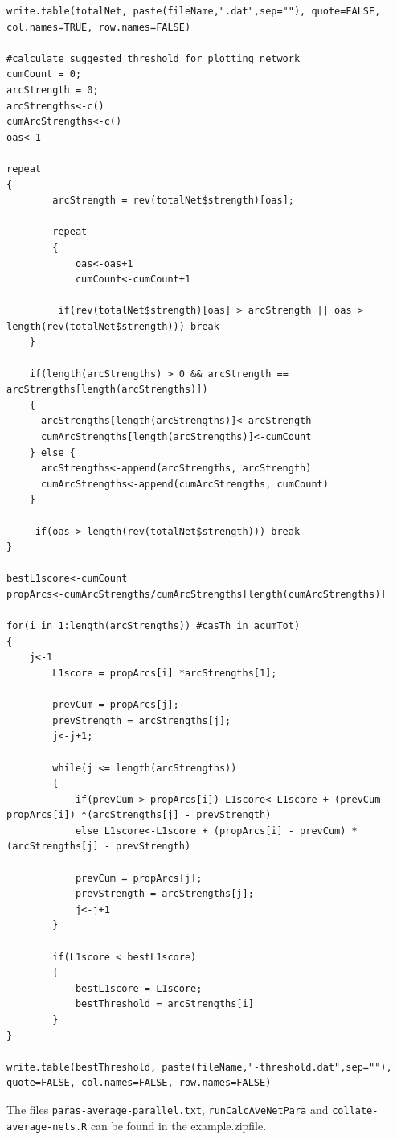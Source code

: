 \documentclass[a4paper,12pt]{article}
\newcommand{\code}[1]{{\footnotesize{{\tt #1}}}}
\begin{document}
\begin{lstlisting}
write.table(totalNet, paste(fileName,".dat",sep=""), quote=FALSE, col.names=TRUE, row.names=FALSE)

#calculate suggested threshold for plotting network
cumCount = 0;
arcStrength = 0;
arcStrengths<-c()
cumArcStrengths<-c()
oas<-1
    
repeat
{
		arcStrength = rev(totalNet$strength)[oas];
		
		repeat
		{			
			oas<-oas+1
			cumCount<-cumCount+1

		 if(rev(totalNet$strength)[oas] > arcStrength || oas > length(rev(totalNet$strength))) break
    }
    
    if(length(arcStrengths) > 0 && arcStrength == arcStrengths[length(arcStrengths)])
    {
      arcStrengths[length(arcStrengths)]<-arcStrength
      cumArcStrengths[length(arcStrengths)]<-cumCount
    } else {
      arcStrengths<-append(arcStrengths, arcStrength)
      cumArcStrengths<-append(cumArcStrengths, cumCount)
    } 
     
     if(oas > length(rev(totalNet$strength))) break
}
 
bestL1score<-cumCount
propArcs<-cumArcStrengths/cumArcStrengths[length(cumArcStrengths)]

for(i in 1:length(arcStrengths)) #casTh in acumTot) 
{
    j<-1
		L1score = propArcs[i] *arcStrengths[1];
  
		prevCum = propArcs[j];
		prevStrength = arcStrengths[j];
		j<-j+1;

		while(j <= length(arcStrengths)) 
		{
			if(prevCum > propArcs[i]) L1score<-L1score + (prevCum - propArcs[i]) *(arcStrengths[j] - prevStrength)
			else L1score<-L1score + (propArcs[i] - prevCum) *(arcStrengths[j] - prevStrength)
			
			prevCum = propArcs[j];
			prevStrength = arcStrengths[j];
			j<-j+1
		}

		if(L1score < bestL1score)
		{
			bestL1score = L1score;
			bestThreshold = arcStrengths[i]
		}
}
 
write.table(bestThreshold, paste(fileName,"-threshold.dat",sep=""), quote=FALSE, col.names=FALSE, row.names=FALSE)

\end{lstlisting} \vspace{0.35cm}
The files \code{paras-average-parallel.txt}, \code{runCalcAveNetPara} and \code{collate-average-nets.R} can be found in the example.zipfile. 

\end{document}

